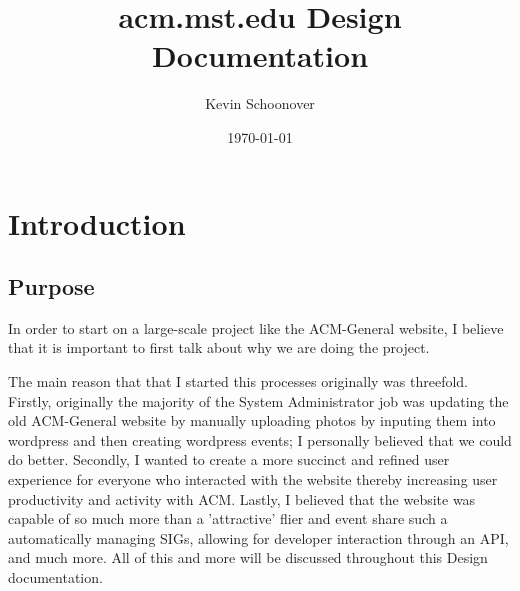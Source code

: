 \documentclass{article}
\title{acm.mst.edu Design Documentation}
\author{Kevin Schoonover}
\date{\today}
\begin{document}
\maketitle

\tableofcontents

\section{Introduction}
\subsection{Purpose}
In order to start on a large-scale project like the ACM-General website, I
believe that it is important to first talk about why we are doing the project.

The main reason that that I started this processes originally was threefold.
Firstly, originally the majority of the System Administrator job was updating
the old ACM-General website by manually uploading photos by inputing them into
wordpress and then creating wordpress events; I personally believed that we
could do better. Secondly, I wanted to create a more succinct and refined user
experience for everyone who interacted with the website thereby increasing user
productivity and activity with ACM. Lastly, I believed that the website was 
capable of so much more than a 'attractive' flier and event share such a
automatically managing SIGs, allowing for developer interaction through an API,
and much more. All of this and more will be discussed throughout this Design
documentation.
\end{document}
